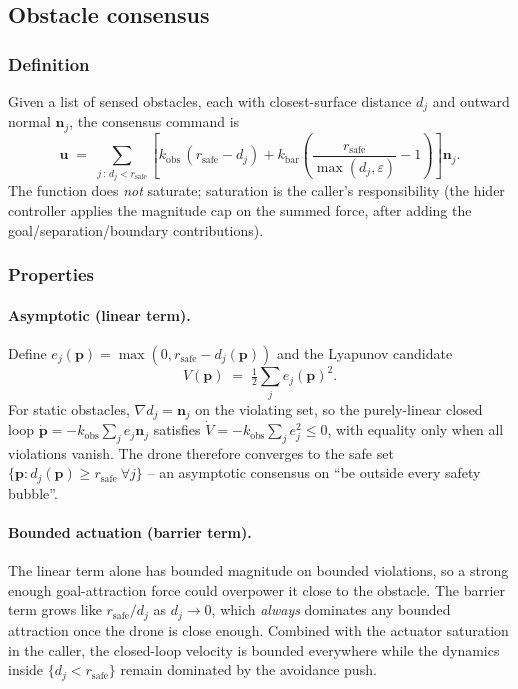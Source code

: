 \documentclass[11pt,a4paper]{article}
\newcommand{\vect}[1]{\mathbf{#1}}
\begin{document}
\subsection{Obstacle consensus}
\label{sec:obs-consensus}
\subsubsection*{Definition}

Given a list of sensed obstacles, each with closest-surface distance $d_j$ and
outward normal $\vect{n}_j$, the consensus command is
\[
    \vect{u} \;=\; \sum_{j \,:\, d_j < r_\mathrm{safe}} \left[
                       k_\mathrm{obs}\,(r_\mathrm{safe} - d_j)
                     + k_\mathrm{bar}\!\left(\frac{r_\mathrm{safe}}{\max(d_j,\varepsilon)} - 1\right)
                   \right] \vect{n}_j.
\]
The function does \emph{not} saturate; saturation is the caller's
responsibility (the hider controller applies the magnitude cap on the summed
force, after adding the goal/separation/boundary contributions).

\subsubsection*{Properties}

\paragraph{Asymptotic (linear term).}
Define $e_j(\vect{p}) = \max(0, r_\mathrm{safe} - d_j(\vect{p}))$ and the
Lyapunov candidate
\[
    V(\vect{p}) \;=\; \tfrac{1}{2} \sum_j e_j(\vect{p})^2.
\]
For static obstacles, $\nabla d_j = \vect{n}_j$ on the violating set, so the
purely-linear closed loop $\dot{\vect{p}} = -k_\mathrm{obs}\sum_j e_j \vect{n}_j$
satisfies $\dot{V} = -k_\mathrm{obs}\sum_j e_j^2 \le 0$, with equality only when
all violations vanish. The drone therefore converges to the safe set $\{\vect{p}
: d_j(\vect{p}) \ge r_\mathrm{safe}\ \forall j\}$ -- an asymptotic consensus on
``be outside every safety bubble''.

\paragraph{Bounded actuation (barrier term).}
The linear term alone has bounded magnitude on bounded violations, so a
strong enough goal-attraction force could overpower it close to the obstacle.
The barrier term grows like $r_\mathrm{safe}/d_j$ as $d_j \to 0$, which
\emph{always} dominates any bounded attraction once the drone is close enough.
Combined with the actuator saturation in the caller, the closed-loop velocity
is bounded everywhere while the dynamics inside $\{d_j < r_\mathrm{safe}\}$
remain dominated by the avoidance push.
\end{document}
